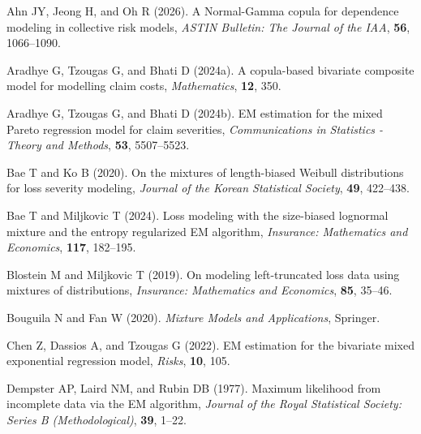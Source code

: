 \documentclass[eng]{csam}
\begin{document}
\begin{reference}
Ahn JY, Jeong H, and Oh R (2026). A Normal-Gamma copula for dependence modeling in collective risk models, {\em ASTIN Bulletin: The Journal of the IAA}, {\bf 56}, 1066--1090.

Aradhye G, Tzougas G, and Bhati D (2024a). A copula-based bivariate composite model for modelling claim costs, {\em Mathematics}, {\bf 12}, 350.

Aradhye G, Tzougas G, and Bhati D (2024b). EM estimation for the mixed Pareto regression model for claim severities, {\em Communications in Statistics - Theory and Methods}, {\bf 53}, 5507--5523.

Bae T and Ko B (2020). On the mixtures of length-biased Weibull distributions for loss severity modeling, {\em Journal of the Korean Statistical Society}, {\bf 49}, 422--438.

Bae T and Miljkovic T (2024). Loss modeling with the size-biased lognormal mixture and the entropy regularized EM algorithm, {\em Insurance: Mathematics and Economics}, {\bf 117}, 182--195.

Blostein M and Miljkovic T (2019). On modeling left-truncated loss data using mixtures of distributions, {\em Insurance: Mathematics and Economics}, {\bf 85}, 35--46.

Bouguila N and Fan W (2020). {\em Mixture Models and Applications}, Springer.

Chen Z, Dassios A, and Tzougas G (2022). EM estimation for the bivariate mixed exponential regression model, {\em Risks}, {\bf 10}, 105.

Dempster AP, Laird NM, and Rubin DB (1977). Maximum likelihood from incomplete data via the EM algorithm, {\em Journal of the Royal Statistical Society: Series B (Methodological)}, {\bf 39}, 1--22.


\end{reference}
\end{document}
